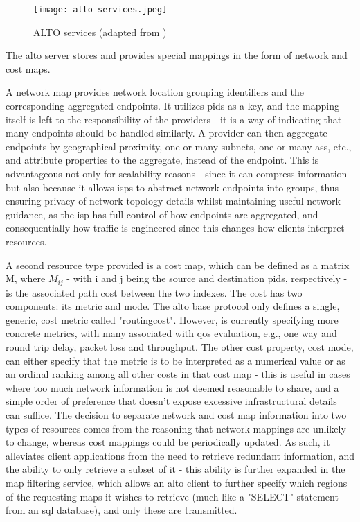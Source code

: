     \begin{figure}[H]
    \centering
    \texttt{[image: alto-services.jpeg]}
    \caption{ALTO services (adapted from \cite{alto-protocol}) }
    \label{fig:alto-services}
    \end{figure}

    The \gls{alto} server stores and provides special mappings in the form of network and cost maps.

    A network map provides network location grouping identifiers and the corresponding aggregated endpoints.
    It utilizes \glspl{pid} as a key, and the mapping itself is left to the responsibility of the providers - it is a way of indicating that many endpoints should be handled similarly.
    A provider can then aggregate endpoints by geographical proximity, one or many subnets, one or many \glspl{as}, etc., and attribute properties to the aggregate, instead of the endpoint.
    This is advantageous not only for scalability reasons - since it can compress information - but also because it allows \glspl{isp} to abstract network endpoints into groups, thus ensuring privacy of network topology details whilst maintaining useful network guidance, as the \gls{isp} has full control of how endpoints are aggregated, and consequentially how traffic is engineered since this changes how clients interpret resources.

    A second resource type provided is a cost map, which can be defined as a matrix M, where $M_{ij}$ - with i and j being the source and destination \glspl{pid}, respectively - is the associated path cost between the two indexes.
    The cost has two components: its metric and mode.
    The \gls{alto} base protocol only defines a single, generic, cost metric called "routingcost".
    However, \cite{alto-cost-metrics} is currently specifying more concrete metrics, with many associated with \gls{qos} evaluation, e.g., one way and round trip delay, packet loss and throughput.
    The other cost property, cost mode, can either specify that the metric is to be interpreted as a numerical value or as an ordinal ranking among all other costs in that cost map - this is useful in cases where too much network information is not deemed reasonable to share, and a simple order of preference that doesn't expose excessive infrastructural details can suffice.
    The decision to separate network and cost map information into two types of resources comes from the reasoning that network mappings are unlikely to change, whereas cost mappings could be periodically updated.
    As such, it alleviates client applications from the need to retrieve redundant information, and the ability to only retrieve a subset of it - this ability is further expanded in the map filtering service, which allows an \gls{alto} client to further specify which regions of the requesting maps it wishes to retrieve (much like a "SELECT" statement from an \gls{sql} database), and only these are transmitted.

